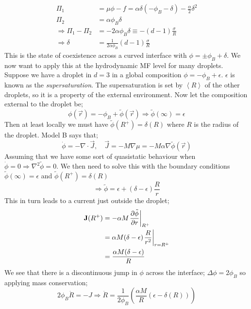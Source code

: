 \begin{align*}
\Pi_1 &= \mu\phi - f = \alpha \delta (- \phi_B - \delta) - \frac{\alpha}{2}\delta^2 \\
\Pi_2 &= \alpha \phi_B \delta \\
\Rightarrow \Pi_1 - \Pi_2 &= -2\alpha \phi_B \delta \equiv -(d - 1)\frac{\sigma}{R} \\
\Rightarrow \delta &= \frac{1}{2\alpha \phi_B}(d - 1) \frac{\sigma}{R}
\end{align*}
This is the state of coexistence across a curved interface with $\phi = \pm \phi_B + \delta$. We now want to apply this at the hydrodynamic MF level for many droplets. Suppose we have a droplet in $d = 3$ in a global composition $\phi = -\phi_B + \epsilon$. $\epsilon$ is known as the \emph{supersaturation}. The supersaturation is set by $\left< R \right>$ of the other droplets, so it is a property of the external environment. Now let the composition external to the droplet be;
\begin{equation}
\phi(\vec{r}) = -\phi_B + \tilde{\phi}(\vec{r}) \Rightarrow \tilde{\phi}(\infty) = \epsilon
\end{equation}
Then at least locally we must have $\tilde{\phi}(R^{+}) = \delta(R)$ where $R$ is the radius of the droplet. Model B says that;
\begin{equation*}
\dot{\phi} = -\nabla \cdot \vec{J}, \quad \vec{J} = -M\nabla \mu = -M \alpha \nabla \tilde{\phi}(\vec{r})
\end{equation*}
Assuming that we have some sort of quasistatic behaviour when $\dot{\phi} = 0 \Rightarrow \nabla^2 \tilde{\phi} = 0$. We then need to solve this with the boundary conditions $\tilde{\phi}(\infty) = \epsilon$ and $\tilde{\phi}(R^{+}) = \delta(R)$
\begin{equation}
\Rightarrow \tilde{\phi} = \epsilon + (\delta - \epsilon)\frac{R}{r}
\end{equation}
This in turn leads to a current just outside the droplet;
\begin{align*}
\vec{J}(R^{+}) &= -\alpha M \left.\frac{\del \tilde{\phi}}{\del r}\right|_{R^+} \\
&= \alpha M (\delta - \epsilon) \left.\frac{R}{r^2}\right|_{r = R^{+}} \\
&= \frac{\alpha M (\delta - \epsilon)}{R}
\end{align*}
We see that there is a discontinuous jump in $\phi$ across the interface; $\Delta \phi = 2\phi_B$ so applying mass conservation;
\begin{equation*}
2\phi_B \dot{R} = - J \Rightarrow \dot{R} = \frac{1}{2\phi_B}\left(\frac{\alpha M}{R}\left(\epsilon - \delta(R)\right)\right)
\end{equation*}
